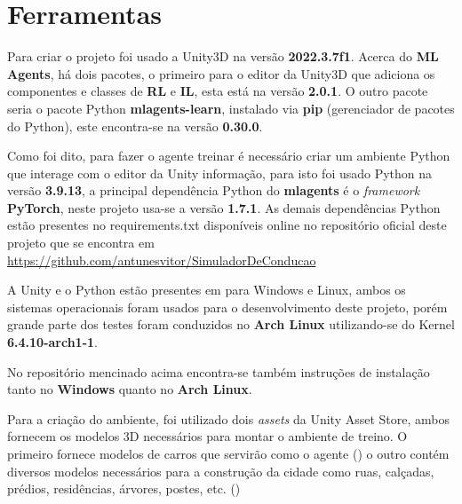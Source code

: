 \chapter{Ferramentas}\label{cap:ferramentas}

Para criar o projeto foi usado a Unity3D na versão \textbf{2022.3.7f1}. Acerca do \textbf{ML Agents}, há dois pacotes, o primeiro para o editor da Unity3D que adiciona os componentes e classes de \textbf{RL} e \textbf{IL}, esta está na versão \textbf{2.0.1}. O outro pacote seria o pacote Python \textbf{mlagents-learn}, instalado via \textbf{pip} (gerenciador de pacotes do Python), este encontra-se na versão \textbf{0.30.0}. 

Como foi dito, para fazer o agente treinar é necessário criar um ambiente Python que interage com o editor da Unity informação, para isto foi usado Python na versão \textbf{3.9.13}, a principal dependência Python do \textbf{mlagents} é o \textit{framework} \textbf{PyTorch}, neste projeto usa-se a versão \textbf{1.7.1}. As demais dependências Python estão presentes no requirements.txt disponíveis online no repositório oficial deste projeto que se encontra em \href{https://github.com/antunesvitor/SimuladorDeConducao}{https://github.com/antunesvitor/SimuladorDeConducao}

A Unity e o Python estão presentes em para Windows e Linux, ambos os sistemas operacionais foram usados para o desenvolvimento deste projeto, porém grande parte dos testes foram conduzidos no \textbf{Arch Linux} utilizando-se do Kernel \textbf{6.4.10-arch1-1}.


No repositório mencinado acima encontra-se também instruções de instalação tanto no \textbf{Windows} quanto no \textbf{Arch Linux}.

Para a criação do ambiente, foi utilizado dois \textit{assets} da Unity Asset Store, ambos fornecem os modelos 3D necessários para montar o ambiente de treino. O primeiro fornece modelos de carros que servirão como o agente () o outro contém diversos modelos necessários para a construção da cidade como ruas, calçadas, prédios, residências, árvores, postes, etc. ()

